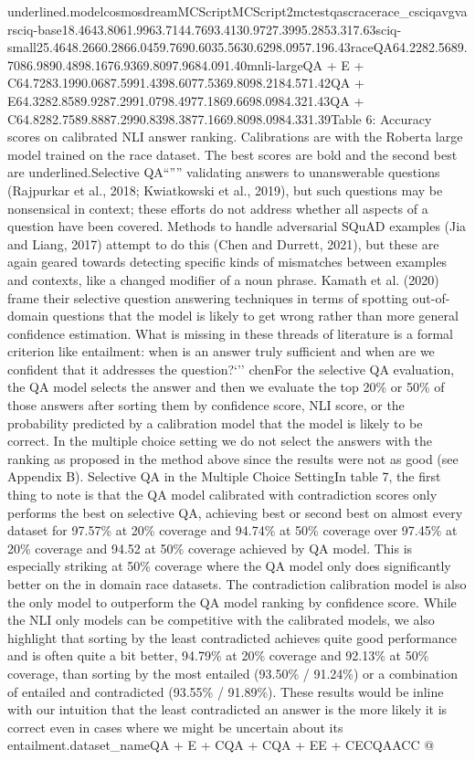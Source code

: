 \documentclass{scrbook}
\begin{document}
underlined.modelcosmosdreamMCScriptMCScript2mctestqascracerace\_csciqavgvarsciq-base18.4643.8061.9963.7144.7693.4130.9727.3995.2853.317.63sciq-small25.4648.2660.2866.0459.7690.6035.5630.6298.0957.196.43raceQA64.2282.5689.7086.9890.4898.1676.9369.8097.9684.091.40mnli-largeQA + E + C64.7283.1990.0687.5991.4398.6077.5369.8098.2184.571.42QA + E64.3282.8589.9287.2991.0798.4977.1869.6698.0984.321.43QA + C64.8282.7589.8887.2990.8398.3877.1669.8098.0984.331.39Table 6: Accuracy scores on calibrated NLI answer ranking. Calibrations are with the Roberta large model trained on the race dataset. The best scores are bold and the second best are underlined.Selective QA``'''' validating answers to unanswerable questions (Rajpurkar et al., 2018; Kwiatkowski et al., 2019), but such questions may be nonsensical in context; these efforts do not address whether all aspects of a question have been covered. Methods to handle adversarial SQuAD examples (Jia and Liang, 2017) attempt to do this (Chen and Durrett, 2021), but these are again geared towards detecting specific kinds of mismatches between examples and contexts, like a changed modifier of a noun phrase. Kamath et al. (2020) frame their selective question answering techniques in terms of spotting out-of-domain questions that the model is likely to get wrong rather than more general confidence estimation. What is missing in these threads of literature is a formal criterion like entailment: when is an answer truly sufficient and when are we confident that it addresses the question?‘’’ chenFor the selective QA evaluation, the QA model selects the answer and then we evaluate the top 20\% or 50\% of those answers after sorting them by confidence score, NLI score, or the probability predicted by a calibration model that the model is likely to be correct. In the multiple choice setting we do not select the answers with the ranking as proposed in the method above since the results were not as good (see Appendix B). Selective QA in the Multiple Choice SettingIn table 7, the first thing to note is that the QA model calibrated with contradiction scores only performs the best on selective QA, achieving best or second best on almost every dataset for 97.57\% at 20\% coverage and 94.74\% at 50\% coverage over 97.45\% at 20\% coverage and 94.52 at 50\% coverage achieved by QA model. This is especially striking at 50\% coverage where the QA model only does significantly better on the in domain race datasets. The contradiction calibration model is also the only model to outperform the QA model ranking by confidence score. While the NLI only models can be competitive with the calibrated models, we also highlight that sorting by the least contradicted achieves quite good performance and is often quite a bit better, 94.79\% at 20\% coverage and 92.13\% at 50\% coverage, than sorting by the most entailed (93.50\% / 91.24\%) or a combination of entailed and contradicted (93.55\% / 91.89\%). These results would be inline with our intuition that the least contradicted an answer is the more likely it is correct even in cases where we might be uncertain about its entailment.dataset\_nameQA + E + CQA + CQA + EE + CECQAACC @ 
\end{document}
